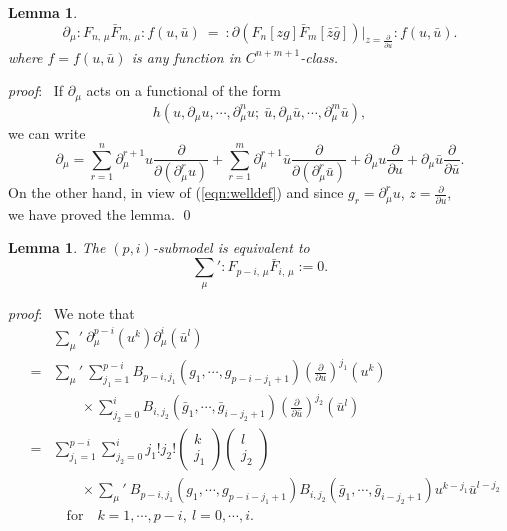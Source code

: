 \documentclass[makeidx,12pt,openany]{report}
\newtheorem{lem}[df]{Lemma}
\begin{document}
\begin{lem}
\begin{equation}
 \partial_{\mu} :F_{n,\, \mu}\bar{F}_{m,\, \mu}:f(u,\bar{u})
 \ =\ 
   :\partial (F_n[zg]\bar{F}_m[\bar{z}\bar{g}])
     |_{z=\frac{\partial}{\partial u}}:f(u,\bar{u}).
\end{equation}
where $f=f(u,\bar{u})$ is any function in $C^{n+m+1}$-class. 
\end{lem}
\textit{proof}: \ 
If $\partial_{\mu}$ acts on a functional of the form
\begin{equation}
 h(u, \partial_{\mu} u, \cdots, \partial_{\mu}^n u;\  
   \bar{u}, \partial_{\mu} \bar{u}, \cdots, \partial_{\mu}^m \bar{u}),
\end{equation}
we can write 
\begin{equation}
 \partial_{\mu} =
     \sum_{r=1}^n
       \partial_{\mu}^{r+1}u
         \frac{\partial}{\partial (\partial_{\mu}^r u)}
    +\sum_{r=1}^m
       \partial_{\mu}^{r+1}\bar{u} 
         \frac{\partial}{\partial (\partial_{\mu}^r \bar{u})}
     +\partial_{\mu}u \frac{\partial}{\partial u}
     +\partial_{\mu}\bar{u} \frac{\partial}{\partial \bar{u}}.
\end{equation}
On the other hand, in view of (\ref{eqn:welldef}) and since
$g_r=\partial_{\mu}^r u$, $z=\frac{\partial}{\partial u}$, \\
we have proved the lemma. \hfill \qed
%
\begin{lem}\label{lem:pi-sub}
The $(p,i)$-submodel is equivalent to 
\begin{equation}
 \sum_{\mu}{}':F_{p-i,\, \mu}\bar{F}_{i,\, \mu}:=0. 
\end{equation}
\end{lem}
\textit{proof}: \ We note that 
\begin{eqnarray*}
  && \sum_{\mu}{}'\ \partial_{\mu}^{p-i}(u^k)\partial_{\mu}^i(\bar{u}^l) \\
  &=& \sum_{\mu}{}'\ \sum_{j_1=1}^{p-i} B_{p-i,j_1}(g_1,\cdots,g_{p-i-j_1+1})
       \left(
        \frac{\partial}{\partial u}
       \right)^{j_1} (u^k) \\
  && \qquad \times 
      \sum_{j_2=0}^i B_{i,j_2}(\bar{g}_1,\cdots,\bar{g}_{i-j_2+1})
       \left(
        \frac{\partial}{\partial \bar{u}}
       \right)^{j_2} (\bar{u}^l) \\
  &=& \sum_{j_1=1}^{p-i} \sum_{j_2=0}^i j_1! j_2!
       \left(
       \begin{array}{cc}
       	 k \\
       	 j_1
       \end{array}
       \right)
       \left(
       \begin{array}{cc}
       	 l \\
       	 j_2
       \end{array}
       \right) \\
   && \qquad \times
       \sum_{\mu}{}'\ B_{p-i,j_1}(g_1,\cdots,g_{p-i-j_1+1}) 
         B_{i,j_2}(\bar{g}_1,\cdots,\bar{g}_{i-j_2+1}) 
          u^{k-j_1} \bar{u}^{l-j_2} \\
  && \quad \mbox{for} \quad k=1,\cdots, p-i, \ l=0,\cdots,i. 
\end{eqnarray*}
\end{document}
